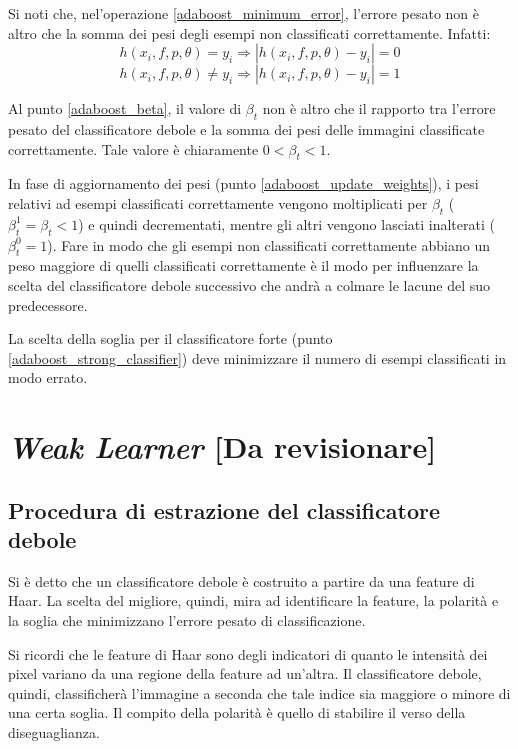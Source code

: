             Si noti che, nel'operazione \ref{adaboost_minimum_error}, l'errore pesato non è altro che la somma dei pesi degli esempi non classificati correttamente. Infatti:
            $$ h(x_i, f, p, \theta) = y_i \Rightarrow |h(x_i, f, p, \theta) - y_i| = 0 $$
            $$ h(x_i, f, p, \theta) \neq y_i \Rightarrow |h(x_i, f, p, \theta) - y_i| = 1 $$

            Al punto \ref{adaboost_beta}, il valore di $\beta_t$ non è altro che il rapporto tra l'errore pesato del classificatore debole e la somma dei pesi delle immagini classificate correttamente. Tale valore è chiaramente $0 < \beta_t < 1$.

            In fase di aggiornamento dei pesi (punto \ref{adaboost_update_weights}), i pesi relativi ad esempi classificati correttamente vengono moltiplicati per $\beta_t$ ($\beta_{t}^{1} = \beta_t < 1$) e quindi decrementati, mentre gli altri vengono lasciati inalterati ($\beta_{t}^{0} = 1$). Fare in modo che gli esempi non classificati correttamente abbiano un peso maggiore di quelli classificati correttamente è il modo per influenzare la scelta del classificatore debole successivo che andrà a colmare le lacune del suo predecessore.

            La scelta della soglia per il classificatore forte (punto \ref{adaboost_strong_classifier}) deve minimizzare il numero di esempi classificati in modo errato.
    
    \section{\emph{Weak Learner} [Da revisionare]}
    \label{sec:weak_learner}
        \subsection{Procedura di estrazione del classificatore debole}
            Si è detto che un classificatore debole è costruito a partire da una feature di Haar. La scelta del migliore, quindi, mira ad identificare la feature, la polarità e la soglia che minimizzano l'errore pesato di classificazione.

            Si ricordi che le feature di Haar sono degli indicatori di quanto le intensità dei pixel variano da una regione della feature ad un'altra. Il classificatore debole, quindi, classificherà l'immagine a seconda che tale indice sia maggiore o minore di una certa soglia. Il compito della polarità è quello di stabilire il verso della diseguaglianza.


